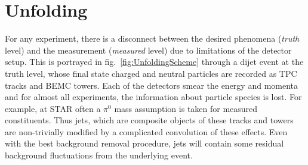 \section{Unfolding}
For any experiment, there is a disconnect between the desired phenomena (\emph{truth} level) and the measurement (\emph{measured} level) due to limitations of the detector setup. This is portrayed in fig.~\ref{fig:UnfoldingScheme} through a dijet event at the truth level, whose final state charged and neutral particles are recorded as TPC tracks and BEMC towers.  Each of the detectors smear the energy and momenta and for almost all experiments,  the information about particle species is lost. For example, at STAR often a \(\pi^0\) mass assumption is taken for measured constituents. Thus jets, which are composite objects of these tracks and towers are non-trivially modified by a complicated convolution of these effects. Even with the best background removal procedure, jets will contain some residual background fluctuations from the underlying event.

